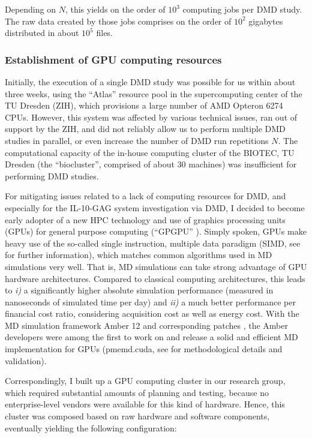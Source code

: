 Depending on $N$, this yields on the order of $10^3$ computing jobs per DMD
study. The raw data created by those jobs comprises on the order of $10^2$
gigabytes distributed in about $10^5$ files.


\subsubsection{Establishment of GPU computing resources}

Initially, the execution of a single DMD study was possible for us within about
three weeks, using the \enquote{Atlas} resource pool in the supercomputing
center of the TU Dresden (ZIH), which provisions a large number of AMD Opteron
6274 CPUs. However, this system was affected by various technical issues, ran
out of support by the ZIH, and did not reliably allow us to perform multiple DMD
studies in parallel, or even increase the number of DMD run repetitions $N$. The
computational capacity of the in-house computing cluster of the BIOTEC, TU
Dresden (the \enquote{biocluster}, comprised of about 30 machines) was
insufficient for performing DMD studies.

For mitigating issues related to a lack of computing resources for DMD, and
especially for the IL-10-GAG system investigation via DMD, I decided to become
early adopter of a new HPC technology and use of graphics processing units
(GPUs) for general purpose computing (\enquote{GPGPU} \cite{wikipedia_gpgpu}).
Simply spoken, GPUs make heavy use of the so-called single instruction, multiple
data paradigm (SIMD, see \cite{kirk2012programming_gpus} for further
information), which matches common algorithms used in MD simulations very well.
That is, MD simulations can take strong advantage of GPU hardware architectures.
Compared to classical computing architectures, this leads to \textit{i)} a
significantly higher absolute simulation performance (measured in nanoseconds of
simulated time per day) and \textit{ii)} a much better performance per financial
cost ratio, considering acquisition cost as well as energy cost. With the MD
simulation framework Amber 12 \cite{case_amber_12} and corresponding patches
\cite{amber_12_patches}, the Amber developers were among the first to work on
and release a solid and efficient MD implementation for GPUs (pmemd.cuda, see
\cite{amber_gpu_2012,amber_gpu_pme_2013} for methodological details and
validation).

Correspondingly, I built up a GPU computing cluster in our research group, which
required substantial amounts of planning and testing, because no
enterprise-level vendors were available for this kind of hardware. Hence, this
cluster was composed based on raw hardware and software components, eventually
yielding the following configuration:

